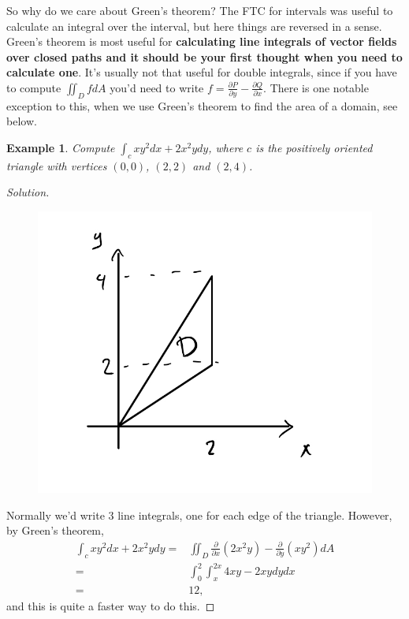 \documentclass[12pt]{article}
\newcommand{\p}{\partial}
\newcommand{\Q}{\frac{\p Q}{\p x}}
\renewcommand{\P}{\frac{\p P}{\p y}}
\newcommand{\py}{\frac{\p}{\p y}}
\newenvironment{solution}
  {\begin{proof}[Solution]}
  {\end{proof}
  
  }
\newtheorem{example}{Example}
\begin{document}
So why do we care about Green's theorem? The FTC for intervals was useful to calculate an integral over the interval, but here things are reversed in a sense. Green's theorem is most useful for \textbf{calculating line integrals of vector fields over closed paths and it should be your first thought when you need to calculate one}. It's usually not that useful for double integrals, since if you have to compute $\iint_D f dA $ you'd need to write $f=\P-\Q$. There is one notable exception to this, when we use Green's theorem to find the area of a domain, see below.

\begin{example}
Compute $\int_c xy^2dx +2x^2 y dy$, where $c$ is the positively oriented triangle with vertices $(0,0)$, $(2,2)$ and $(2,4)$.
\end{example}
\begin{solution}
\begin{figure}[h]
\includegraphics[scale=.3]{example.jpeg}
\end{figure}


Normally we'd write 3 line integrals, one for each edge of the triangle. However, by Green's theorem, \begin{align*}
\int_c xy^2dx +2x^2 y dy=&\iint_D \frac{\p}{\p x}(2x^2y)-\py (xy^2) dA\\
=&\int_0^2\int_x^{2x } 4xy-2xydy dx\\
=&12,
\end{align*} and this is quite a faster way to do this.
\end{solution}
\end{document}
